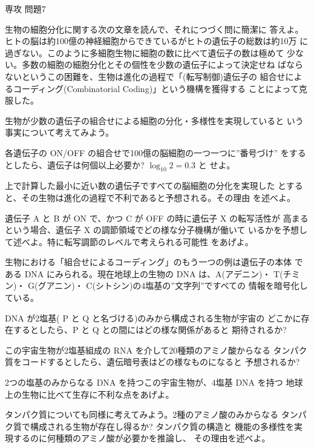 \documentclass[fleqn]{jbook}
\begin{document}
\begin{question}{専攻 問題7}{}

生物の細胞分化に関する次の文章を読んで、それにつづく問に簡潔に
答えよ。\\

ヒトの脳は約100億の神経細胞からできているがヒトの遺伝子の総数は約10万
に過ぎない。このように多細胞生物に細胞の数に比べて遺伝子の数は極めて
少ない。多数の細胞の細胞分化とその個性を少数の遺伝子によって決定せね
ばならないというこの困難を、生物は進化の過程で「(転写制御)遺伝子の
組合せによるコーディング(Combinatorial Coding)」という機構を獲得する
ことによって克服した。

\begin{subquestions}
\SubQuestion
  生物が少数の遺伝子の組合せによる細胞の分化・多様性を実現していると
  いう事実について考えてみよう。

  \begin{subsubquestions}
  \SubSubQuestion
    各遺伝子の ON/OFF の組合せで100億の脳細胞の一つ一つに”番号づけ”
    をするとしたら、遺伝子は何個以上必要か? $\log_{10}2 = 0.3 $ と
    せよ。

  \SubSubQuestion
    上で計算した最小に近い数の遺伝子ですべての脳細胞の分化を実現した
    とすると、その生物は進化の過程で不利であると予想される。その理由
    を述べよ。

  \SubSubQuestion
    遺伝子 A と B が ON で、かつ C が OFF の時に遺伝子 X の転写活性が
    高まるという場合、遺伝子 X の調節領域でどの様な分子機構が働いて
    いるかを予想して述べよ。特に転写調節のレベルで考えられる可能性
    をあげよ。

  \end{subsubquestions}

\SubQuestion
  生物における「組合せによるコーディング」のもう一つの例は遺伝子の本体
  である DNA にみられる。現在地球上の生物の DNA は、A(アデニン)・
  T(チミン)・ G(グアニン)・ C(シトシン)の4塩基の''文字列''ですべての
  情報を暗号化している。

  \begin{subsubquestions}
  \SubSubQuestion
    DNA が2塩基( P と Q と名づける)のみから構成される生物が宇宙の
    どこかに存在するとしたら、P と Q との間にはどの様な関係があると
    期待されるか?

  \SubSubQuestion
    この宇宙生物が2塩基組成の RNA を介して20種類のアミノ酸からなる
    タンパク質をコードするとしたら、遺伝暗号表はどの様なものになると
    予想されるか?

  \SubSubQuestion
    2つの塩基のみからなる DNA を持つこの宇宙生物が、4塩基 DNA を持つ
    地球上の生物に比べて生存に不利な点をあげよ。

  \SubSubQuestion
    タンパク質についても同様に考えてみよう。2種のアミノ酸のみからなる
    タンパク質で構成される生物が存在し得るか? タンパク質の構造と
    機能の多様性を実現するのに何種類のアミノ酸が必要かを推論し、
    その理由を述べよ。

  \end{subsubquestions}
\end{subquestions}
\end{question}
\end{document}
